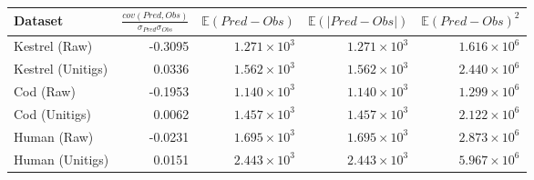 \begin{tabular}{lrrrr}
\toprule
Dataset & $\frac{cov(Pred,Obs)}{\sigma_{Pred} \sigma_{Obs}}$ & $\mathbb{E}(Pred-Obs)$ & $\mathbb{E}(|Pred-Obs|)$ & $\mathbb{E}(Pred-Obs)^2$ \\
\midrule
Kestrel (Raw) & -0.3095 & $1.271 \times 10^{3}$ & $1.271 \times 10^{3}$ & $1.616 \times 10^{6}$ \\
Kestrel (Unitigs) & 0.0336 & $1.562 \times 10^{3}$ & $1.562 \times 10^{3}$ & $2.440 \times 10^{6}$ \\
Cod (Raw) & -0.1953 & $1.140 \times 10^{3}$ & $1.140 \times 10^{3}$ & $1.299 \times 10^{6}$ \\
Cod (Unitigs) & 0.0062 & $1.457 \times 10^{3}$ & $1.457 \times 10^{3}$ & $2.122 \times 10^{6}$ \\
Human (Raw) & -0.0231 & $1.695 \times 10^{3}$ & $1.695 \times 10^{3}$ & $2.873 \times 10^{6}$ \\
Human (Unitigs) & 0.0151 & $2.443 \times 10^{3}$ & $2.443 \times 10^{3}$ & $5.967 \times 10^{6}$ \\
\bottomrule
\end{tabular}